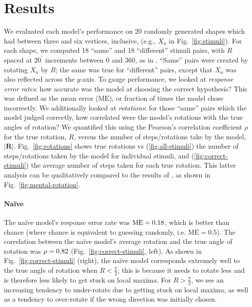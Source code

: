 \documentclass{article} %
\newcommand{\ME}[0]{\mathrm{ME}}
\newcommand{\naive}[0]{na\"ive}
\newcommand{\Naive}[0]{Na\"ive}
\begin{document}
\section{Results}

We evaluated each model's performance on 20 randomly generated shapes
which had between three and six vertices, inclusive, (e.g., $X_a$ in
Fig.~\ref{fig:stimuli}). For each shape, we computed 18 ``same'' and
18 ``different'' stimuli pairs, with $R$ spaced at $20^\prime$
increments between 0 and 360, as in \cite{Shepard1971}. ``Same'' pairs
were created by rotating $X_a$ by $R$; the same was true for
``different'' pairs, except that $X_a$ was also reflected across the
$y$-axis. To gauge performance, we looked at \textit{response error
  rates}: how accurate was the model at choosing the correct
hypothesis? This was defined as the mean error ($\ME{}$), or fraction
of times the model chose incorrectly.  We additionally looked at
\textit{rotations}: for those ``same'' pairs which the model judged
correctly, how correlated were the model's rotations with the true
angles of rotation?  We quantified this using the Pearson's
correlation coefficient $\rho$ for the true rotation, $R$, versus the
number of steps/rotations take by the model, $\vert
\mathbf{R}\vert$. Fig.~\ref{fig:rotations} shows true rotations vs
(\ref{fig:all-stimuli}) the number of steps/rotations taken by the
model for individual stimuli, and (\ref{fig:correct-stimuli}) the
average number of steps taken for each true rotation. This latter
analysis can be qualitatively compared to the results of
\cite{Shepard1971}, as shown in Fig.~\ref{fig:mental-rotation}.

\paragraph{\Naive{}} 

The \naive{} model's response error rate was $\NaiveME{}$, which is
better than chance (where chance is equivalent to guessing randomly,
i.e. $\ME{}=0.5$). The correlation between the \naive{} model's
average rotation and the true angle of rotation was $\rho=0.82{}$
(Fig.~\ref{fig:correct-stimuli}, left). As shown in
Fig.~\ref{fig:correct-stimuli} (right), the \naive{} model corresponds
extremely well to the true angle of rotation when $R<\frac{\pi}{2}$;
this is because it needs to rotate less and is therefore less likely
to get stuck on local maxima. For $R>\frac{\pi}{2}$, we see an
increasing tendency to under-rotate due to getting stuck on local
maxima, as well as a tendency to over-rotate if the wrong direction
was initially chosen.
\end{document}
